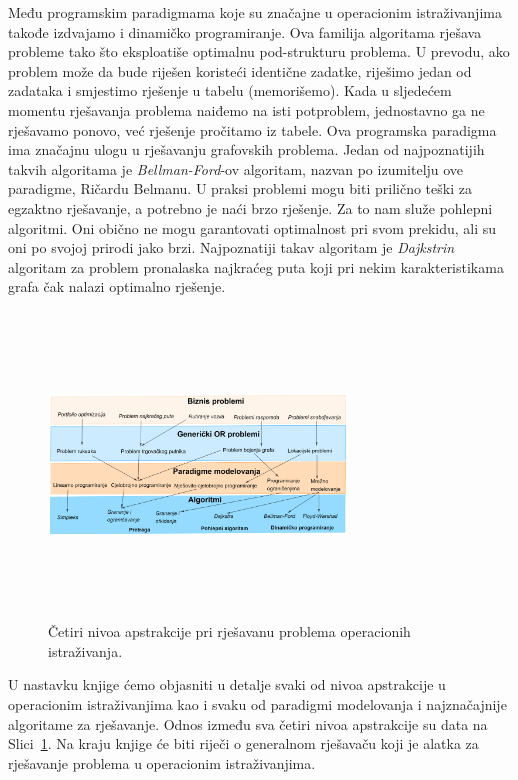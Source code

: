 \documentclass[a4paper, utf8, 11pt, colorlinks]{article}
\begin{document}
Među programskim paradigmama koje su značajne u operacionim istraživanjima takođe izdvajamo i dinamičko programiranje. Ova familija algoritama rješava probleme tako što eksploatiše optimalnu pod-strukturu problema. U prevodu, ako problem može da bude riješen koristeći identične zadatke, riješimo jedan od zadataka i smjestimo rješenje u tabelu (memorišemo). Kada u sljedećem momentu   rješavanja problema naiđemo na isti potproblem, jednostavno ga ne rješavamo ponovo, već rješenje pročitamo iz tabele. Ova programska paradigma ima značajnu ulogu u rješavanju grafovskih problema. Jedan od najpoznatijih takvih algoritama je \emph{Bellman-Ford}-ov algoritam, nazvan po izumitelju ove paradigme, Ričardu Belmanu. 
U praksi problemi mogu biti prilično teški za egzaktno rješavanje, a potrebno je naći brzo rješenje. Za to nam služe pohlepni algoritmi. Oni obično ne mogu 
garantovati optimalnost pri svom prekidu, ali su oni po svojoj prirodi jako brzi. Najpoznatiji takav algoritam je \emph{Dajkstrin} algoritam za problem pronalaska najkraćeg puta koji pri nekim karakteristikama grafa čak nalazi optimalno rješenje. 

\begin{figure}
    \centering
    \includegraphics[width=300, height=230pt]{overview.eps}
    \caption{Četiri nivoa apstrakcije pri rješavanu problema operacionih istraživanja.}
    \label{fig:OR_four_levels}
\end{figure}


U nastavku knjige ćemo objasniti u detalje svaki od nivoa apstrakcije u operacionim istraživanjima kao i svaku od paradigmi modelovanja i najznačajnije algoritame za rješavanje. Odnos između sva četiri nivoa apstrakcije su data na Slici~\ref{fig:OR_four_levels}. 
 Na kraju knjige će biti riječi o generalnom rješavaču koji je alatka za rješavanje problema u operacionim istraživanjima. 
 \\
 \newpage
 
\end{document}

